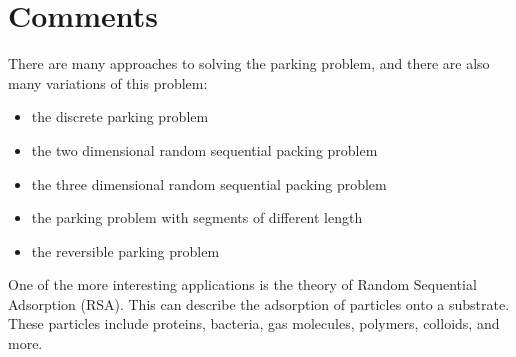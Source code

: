 \documentclass{report}
\begin{document}
\chapter{Comments}

There are many approaches to solving the parking problem, and there are also many variations of this problem: \bigskip

\begin{itemize}
	\item the discrete parking problem
	\item the two dimensional random sequential packing problem
	\item the three dimensional random sequential packing problem
	\item the parking problem with segments of different length
	\item the reversible parking problem 
\end{itemize}\medskip

One of the more interesting applications is the theory of Random Sequential Adsorption (RSA). This can describe the 
adsorption of particles onto a substrate. These particles include proteins, bacteria, gas molecules, polymers, colloids, 
and more. \bigskip




\newpage



\end{document}
